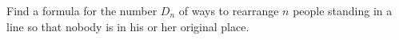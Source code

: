 Find a formula for the number $D_n$ of ways to rearrange $n$ people standing in a line so that nobody is in his or her original place.
